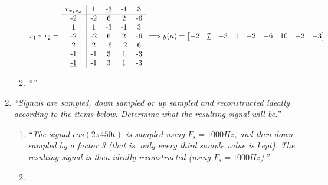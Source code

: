 \documentclass{article}
\begin{document}
\begin{enumerate}
\begin{enumerate}
                \begin{displaymath}
                    x_1*x_2 =
                    \begin{tabular}{c|cccc}
                        $r_{x_1x_2}$    &   1   &   \underline{-3}  &   -1  &   3   \\
                        \hline
                        -2              &   -2  &   6               &   2   &   -6  \\  
                        1               &   1   &   -3              &   -1  &   3   \\
                        -2              &   -2  &   6               &   2   &   -6  \\  
                        2               &   2   &   -6              &   -2  &   6   \\
                        -1              &   -1  &   3               &   1   &   -3  \\
                        \underline{-1}  &   -1  &   3               &   1   &   -3  \\
                    \end{tabular}
                    \Longrightarrow
                    y(n)=
                    \begin{bmatrix}
                        -2 & \underline{7} & -3 & 1 & -2 & -6 & 10 & -2 & -3 
                    \end{bmatrix}
                \end{displaymath}

            \item %
                \emph{``''}
                \\
        \end{enumerate}

    \item %
        \emph{``Signals are sampled, down sampled or up sampled and reconstructed ideally according to the items below. Determine what the resulting signal will be.''}
        \begin{enumerate}
            \item %
                \emph{``The signal $cos(2\pi450t)$ is sampled using $F_s = 1000Hz$, and then down sampled by a
                        factor 3 (that is, only every third sample value is kept). The resulting signal is then
                        ideally reconstructed (using $F_s = 1000 Hz$).''}
                
            \item %
        \end{enumerate}
\end{enumerate}
\end{document}
